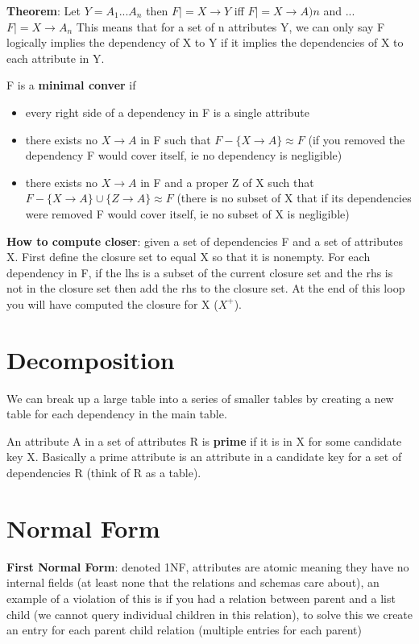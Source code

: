 \documentclass{article}
\begin{document}
\textbf{Theorem}: Let $Y=A_1 ... A_n$ then $F|=X\rightarrow Y$ iff $F|=X\rightarrow A)n$ and ... $F|=X\rightarrow A_n$
This means that for a set of n attributes Y, we can only say F logically implies the dependency of X to Y if it implies the dependencies of X to each attribute in Y.

F is a \textbf{minimal conver} if
\begin{itemize}
    \item every right side of a dependency in F is a single attribute
    \item there exists no $X\rightarrow A$ in F such that $F-\{X\rightarrow A\}\approx F$ (if you removed the dependency F would cover itself, ie no dependency is negligible)
    \item there exists no $X\rightarrow A$ in F and a proper Z of X such that $F-\{X\rightarrow A\}\cup\{Z\rightarrow A\}\approx F$ (there is no subset of X that if its dependencies were removed F would cover itself, ie no subset of X is negligible)
\end{itemize}

\textbf{How to compute closer}: given a set of dependencies F and a set of attributes X. First define the closure set to equal X so that it is nonempty. For each dependency in F, if the lhs is a subset of the current closure set and the rhs is not in the closure set then add the rhs to the closure set. At the end of this loop you will have computed the closure for X ($X^+$).


\section*{Decomposition} %
\label{sec:decomposition}
We can break up a large table into a series of smaller tables by creating a new table for each dependency in the main table.

An attribute A in a set of attributes R is \textbf{prime} if it is in X for some candidate key X. Basically a prime attribute is an attribute in a candidate key for a set of dependencies R (think of R as a table).

\section*{Normal Form} %
\label{sec:normal_form}
\textbf{First Normal Form}: denoted 1NF, attributes are atomic meaning they have no internal fields (at least none that the relations and schemas care about), an example of a violation of this is if you had a relation between parent and a list child (we cannot query individual children in this relation), to solve this we create an entry for each parent child relation (multiple entries for each parent)
\end{document}
